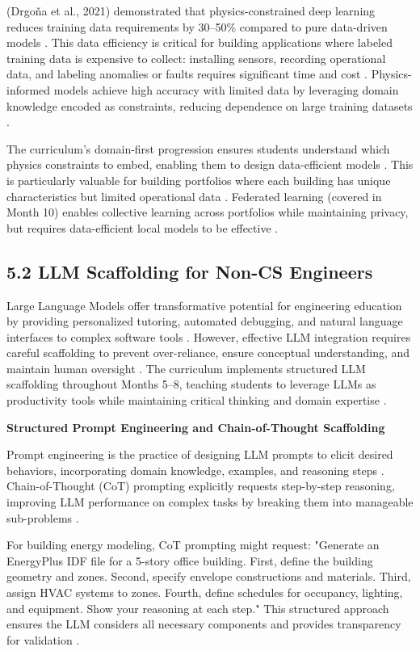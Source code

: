 \documentclass[12pt,a4paper]{article}
\begin{document}
(Drgo\v{n}a et al., 2021) demonstrated that physics-constrained deep learning reduces training data requirements by 30--50\% compared to pure data-driven models \cite{ref265}. This data efficiency is critical for building applications where labeled training data is expensive to collect: installing sensors, recording operational data, and labeling anomalies or faults requires significant time and cost \cite{ref266}. Physics-informed models achieve high accuracy with limited data by leveraging domain knowledge encoded as constraints, reducing dependence on large training datasets \cite{ref267}.

The curriculum's domain-first progression ensures students understand which physics constraints to embed, enabling them to design data-efficient models \cite{ref268}. This is particularly valuable for building portfolios where each building has unique characteristics but limited operational data \cite{ref269}. Federated learning (covered in Month 10) enables collective learning across portfolios while maintaining privacy, but requires data-efficient local models to be effective \cite{ref270}.

\subsection{5.2 LLM Scaffolding for Non-CS Engineers}

Large Language Models offer transformative potential for engineering education by providing personalized tutoring, automated debugging, and natural language interfaces to complex software tools \cite{ref271}. However, effective LLM integration requires careful scaffolding to prevent over-reliance, ensure conceptual understanding, and maintain human oversight \cite{ref272}. The curriculum implements structured LLM scaffolding throughout Months 5--8, teaching students to leverage LLMs as productivity tools while maintaining critical thinking and domain expertise \cite{ref273}.

\textbf{Structured Prompt Engineering and Chain-of-Thought Scaffolding}

Prompt engineering is the practice of designing LLM prompts to elicit desired behaviors, incorporating domain knowledge, examples, and reasoning steps \cite{ref274}. Chain-of-Thought (CoT) prompting explicitly requests step-by-step reasoning, improving LLM performance on complex tasks by breaking them into manageable sub-problems \cite{ref275}.

For building energy modeling, CoT prompting might request: "Generate an EnergyPlus IDF file for a 5-story office building. First, define the building geometry and zones. Second, specify envelope constructions and materials. Third, assign HVAC systems to zones. Fourth, define schedules for occupancy, lighting, and equipment. Show your reasoning at each step." \cite{ref276} This structured approach ensures the LLM considers all necessary components and provides transparency for validation \cite{ref277}.
\end{document}
